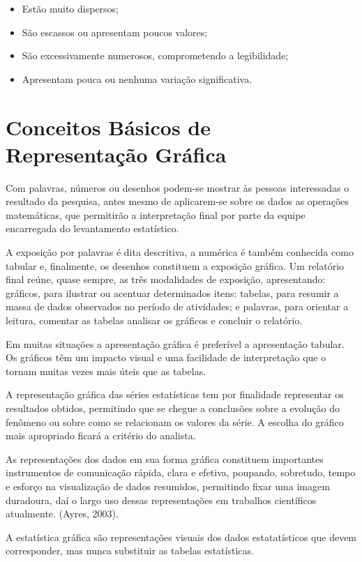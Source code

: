\begin{itemize}
\item Estão muito dispersos; 
\item São escassos ou apresentam poucos valores; 
\item São excessivamente numerosos, comprometendo a legibilidade; 
\item Apresentam pouca ou nenhuma variação significativa.
\end{itemize}

\section{Conceitos Básicos de Representação Gráfica}

Com palavras, números ou desenhos podem-se mostrar às pessoas interessadas o resultado da pesquisa, antes mesmo de aplicarem-se sobre os dados as operações matemáticas, que permitirão a interpretação final por parte da equipe encarregada do levantamento estatístico.\vskip0.3cm

A exposição por palavras é dita descritiva, a numérica é também conhecida como tabular e, finalmente, os desenhos constituem a exposição gráfica. Um relatório final reúne, quase sempre, as três modalidades de exposição, apresentando: gráficos, para ilustrar ou acentuar determinados itens: tabelas, para resumir a massa de dados observados no período de atividades; e palavras, para orientar a leitura, comentar as tabelas analisar os gráficos e concluir o relatório.\vskip0.3cm

Em muitas situações a apresentação gráfica é preferível a apresentação tabular. Os gráficos têm um impacto visual e uma facilidade de interpretação que o tornam muitas vezes mais úteis que as tabelas.\vskip0.3cm

A representação gráfica das séries estatísticas tem por finalidade representar os resultados obtidos, permitindo que se chegue a conclusões sobre a evolução do fenômeno ou sobre como se relacionam os valores da série. A escolha do gráfico mais apropriado ficará a critério do analista.\vskip0.3cm


As representações dos dados em sua forma gráfica constituem importantes instrumentos de comunicação rápida, clara e efetiva, poupando, sobretudo, tempo e esforço na visualização de dados resumidos, permitindo fixar uma imagem duradoura, daí o largo uso dessas representações em trabalhos científicos atualmente. (Ayres, 2003).\vskip0.3cm

A estatística gráfica são representações visuais dos dados estatatísticos que devem corresponder, mas nunca substituir as tabelas estatísticas.



